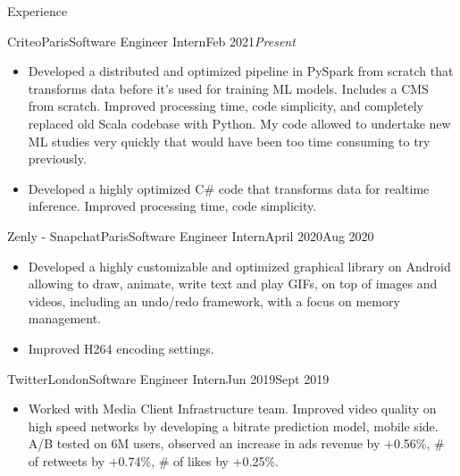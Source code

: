 \documentclass{resume}
\begin{document}
	\begin{rSection}{Experience}
        \begin{job}{Criteo}{Paris}{Software Engineer Intern}{Feb 2021}{\em{Present}}{
            \begin{itemize}
                \item Developed a distributed and optimized pipeline in PySpark from scratch that transforms data before it's used for training ML models. Includes a CMS from scratch. Improved processing time, code simplicity, and completely replaced old Scala codebase with Python. My code allowed to undertake new ML studies very quickly that would have been too time consuming to try previously.
                \item Developed a highly optimized C\# code that transforms data for realtime inference. Improved processing time, code simplicity.
            \end{itemize}
        }
        \end{job}

        \begin{job}{Zenly - Snapchat}{Paris}{Software Engineer Intern}{April 2020}{Aug 2020}{
            \begin{itemize}
                \item Developed a highly customizable and optimized graphical library on Android allowing to draw, animate, write text and play GIFs, on top of images and videos, including an undo/redo framework, with a focus on memory management.
                \item Improved H264 encoding settings.
            \end{itemize}
        }
        \end{job}

        \begin{job}{Twitter}{London}{Software Engineer Intern}{Jun 2019}{Sept 2019}{
            \begin{itemize}
                \item Worked with Media Client Infrastructure team. Improved video quality on high speed networks by developing a bitrate prediction model, mobile side. A/B tested on 6M users, observed an increase in ads revenue by +0.56\%, \# of retweets by +0.74\%, \# of likes by +0.25\%.
            \end{itemize}
        }
        \end{job}


\end{rSection}
\end{document}
